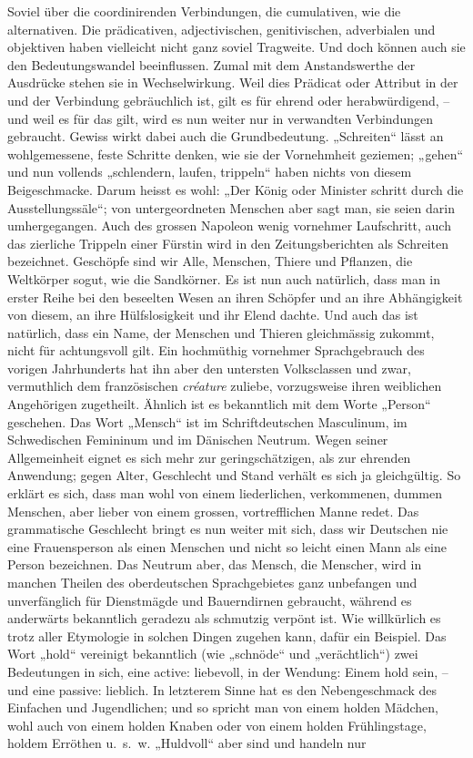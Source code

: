 {Soviel über die coordinirenden Verbindungen, die cumulativen, wie die alternativen. Die prädicativen, adjectivischen, genitivischen, adverbialen und objektiven haben vielleicht nicht ganz soviel Tragweite. Und doch können auch sie den Bedeutungswandel beeinflussen. Zumal mit dem Anstandswerthe der Ausdrücke stehen sie in Wechselwirkung. Weil dies Prädicat oder Attribut in der und der Verbindung gebräuchlich ist, gilt es für ehrend oder herabwürdigend, – und weil es für das gilt, wird es nun weiter nur in verwandten Verbindungen gebraucht. Gewiss wirkt dabei auch die Grundbedeutung. „Schreiten“ lässt an wohlgemessene, feste Schritte denken, wie sie der Vornehmheit geziemen; „gehen“ und nun vollends „schlendern, laufen, trippeln“ haben nichts von diesem Beigeschmacke. Darum heisst es wohl: „Der König oder Minister schritt durch die Ausstellungs\-säle“; von untergeordneten Menschen aber sagt man, sie seien darin umhergegangen. Auch des grossen Napoleon wenig vornehmer Laufschritt, auch das zierliche Trippeln einer Fürstin wird in den Zeitungsberichten als Schreiten bezeichnet. Geschöpfe sind wir Alle, Menschen, Thiere und Pflanzen, die Weltkörper sogut, wie die Sandkörner. Es ist nun auch natürlich, dass man in erster Reihe bei den beseelten Wesen an ihren Schöpfer und an ihre Abhängigkeit von diesem, an ihre Hülfslosigkeit und ihr Elend dachte. Und auch das ist \label{fp.234} natürlich, dass ein Name, der Menschen und Thieren gleichmässig zukommt, nicht für achtungsvoll gilt. Ein hochmüthig vornehmer Sprachgebrauch des vorigen Jahrhunderts hat ihn aber den untersten Volksclassen und zwar, vermuthlich dem französischen \textit{créature} zuliebe, vorzugsweise ihren weiblichen Angehörigen zugetheilt. Ähnlich ist es bekanntlich mit dem Worte „Person“ geschehen. Das Wort „Mensch“ ist im Schriftdeutschen Masculinum, im Schwedischen Femininum und im Dänischen Neutrum. Wegen seiner Allgemeinheit eignet es sich mehr zur geringschätzigen, als zur ehrenden Anwendung; gegen Alter, Geschlecht und Stand verhält es sich ja gleichgültig. So erklärt es sich, dass man wohl von einem liederlichen, verkommenen, dummen Menschen, aber lieber von einem grossen, vortrefflichen Manne redet. Das grammatische Ge\-\label{sp.236}schlecht bringt es nun weiter mit sich, dass wir Deutschen nie eine Frauensperson als einen Menschen und nicht so leicht einen Mann als eine Person bezeichnen. Das Neutrum aber, das Mensch,  die Menscher, wird in manchen Theilen des oberdeutschen Sprachgebietes ganz unbefangen und unverfänglich für Dienstmägde und Bauerndirnen gebraucht, während es anderwärts bekanntlich geradezu als schmutzig verpönt ist. Wie willkürlich es  trotz aller Etymologie in solchen Dingen zugehen kann, dafür ein Beispiel. Das Wort „hold“ vereinigt bekanntlich (wie „schnöde“ und „verächtlich“) zwei Bedeutungen in sich, eine active: liebevoll, in der Wendung: Einem hold sein, – und eine passive: lieblich. In letzterem Sinne hat es den Nebengeschmack des Einfachen und Jugendlichen; und so spricht man von einem holden Mädchen, wohl auch von einem holden Knaben oder von einem holden Frühlingstage, holdem Erröthen u.~s.~w. „Huldvoll“ aber sind und handeln nur }
